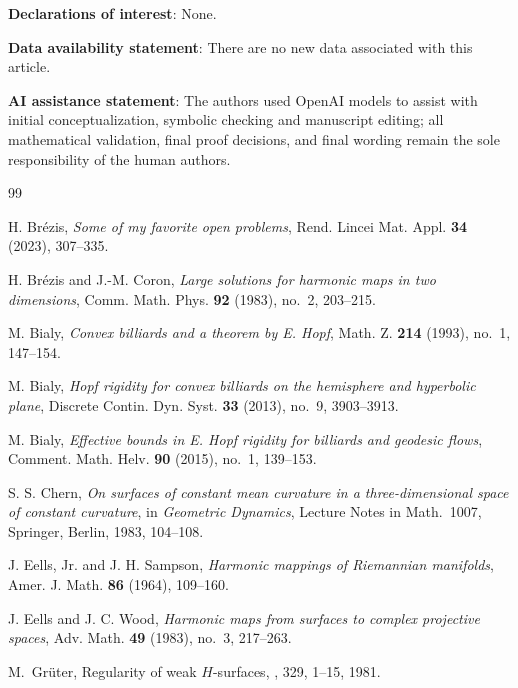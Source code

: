 \documentclass[11pt]{amsart}
\numberwithin{equation}{section}
\theoremstyle{remark}
\begin{document}
\makeatletter
\begingroup
\def\@tocwrite#1#2{}%


\noindent \textbf{Declarations of interest}: None.

\bigskip
\noindent \textbf{Data availability statement}: There are no new data associated with this article.

\bigskip
\noindent \textbf{AI assistance statement}: The authors used OpenAI models to assist with initial conceptualization, symbolic checking and
manuscript editing; all mathematical validation, final proof decisions, and final wording remain the sole responsibility of the human authors.




\begin{thebibliography}{99}

H. Br\'ezis,
\emph{Some of my favorite open problems},
Rend. Lincei Mat. Appl. \textbf{34} (2023), 307--335.

H. Br\'ezis and J.-M. Coron,
\emph{Large solutions for harmonic maps in two dimensions},
Comm. Math. Phys. \textbf{92} (1983), no.~2, 203--215.



M. Bialy,
\emph{Convex billiards and a theorem by E. Hopf},
Math. Z. \textbf{214} (1993), no.~1, 147--154.

M. Bialy,
\emph{Hopf rigidity for convex billiards on the hemisphere and hyperbolic plane},
Discrete Contin. Dyn. Syst. \textbf{33} (2013), no.~9, 3903--3913.

M. Bialy,
\emph{Effective bounds in E. Hopf rigidity for billiards and geodesic flows},
Comment. Math. Helv. \textbf{90} (2015), no.~1, 139--153.

S. S. Chern,
\emph{On surfaces of constant mean curvature in a three-dimensional space of constant curvature},
in \emph{Geometric Dynamics}, Lecture Notes in Math.~1007, Springer, Berlin, 1983, 104--108.

J. Eells, Jr. and J. H. Sampson,
\emph{Harmonic mappings of Riemannian manifolds},
Amer. J. Math. \textbf{86} (1964), 109--160.

J. Eells and J. C. Wood,
\emph{Harmonic maps from surfaces to complex projective spaces},
Adv. Math. \textbf{49} (1983), no.~3, 217--263.

M.~Gr\"uter,
\newblock Regularity of weak \(H\)-surfaces,
, 329, 1--15, 1981.


\end{thebibliography}
\end{document}
